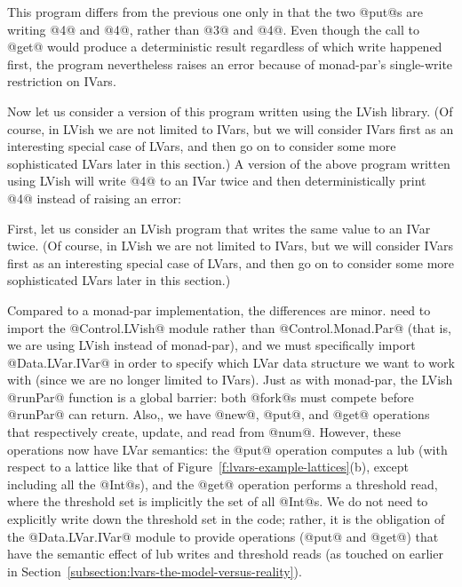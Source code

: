 This program differs from the previous one only in that the two @put@s
are writing @4@ and @4@, rather than @3@ and @4@.  Even though the
call to @get@ would produce a deterministic result regardless of which
write happened first, the program nevertheless raises an error because
of monad-par's single-write restriction on IVars.

Now let us consider a version of this program written using the LVish
library. (Of course, in LVish we are not limited to IVars, but we
will consider IVars first as an interesting special case of LVars, and
then go on to consider some more sophisticated LVars later in this
section.)  A version of the above program written using LVish will
write @4@ to an IVar twice and then deterministically print @4@
instead of raising an error:
\fi

\ifdefined\JOURNAL
First, let us consider an LVish program that writes the same value to
an IVar twice.  (Of course, in LVish we are not limited to IVars, but
we will consider IVars first as an interesting special case of LVars,
and then go on to consider some more sophisticated LVars later in this
section.)
\fi

\singlespacing

\doublespacing

\ifdefined\JOURNAL
\noindent Compared to a monad-par implementation, the differences are minor.
\fi
{} need to import the @Control.LVish@ module rather than
@Control.Monad.Par@ (that is, we are using LVish instead of
monad-par), and we must specifically import @Data.LVar.IVar@ in order
to specify which LVar data structure we want to work with (since we
are no longer limited to IVars).  Just as with monad-par, the LVish
@runPar@ function is a global barrier: both @fork@s must compete
before @runPar@ can return.  Also,, we have @new@, @put@,
and @get@ operations that respectively create, update, and read from
@num@.  However, these operations now have LVar semantics: the @put@
operation computes a lub (with respect to a lattice like that of
Figure~\ref{f:lvars-example-lattices}(b), except including all the
@Int@s), and the @get@ operation performs a threshold read, where the
threshold set is implicitly the set of all @Int@s.  We do not need to
explicitly write down the threshold set in the code; rather, it is the
obligation of the @Data.LVar.IVar@ module to provide operations (@put@
and @get@) that have the semantic effect of lub writes and threshold
reads (as  touched on earlier in
Section~\ref{subsection:lvars-the-model-versus-reality}).

